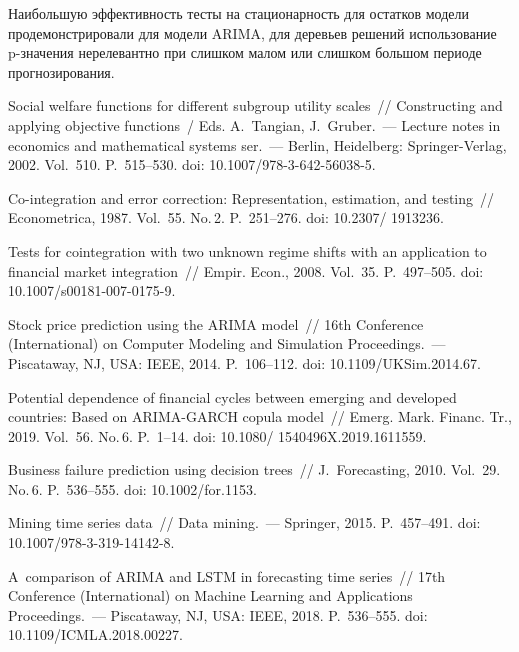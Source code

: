 \begin{multicols}{2}
Наибольшую эффективность тесты на стационарность для остатков модели продемонстрировали 
для модели ARIMA, для деревьев решений использование p-зна\-че\-ния нерелевантно при слишком 
малом или слишком большом периоде прогнозирования.

{\small\frenchspacing
 {%
 \begin{thebibliography}{99}

Social welfare functions for different subgroup utility scales~// 
Constructing and applying objective functions~/ Eds. A.~Tangian, J.~Gruber.~--- 
Lecture notes in economics and mathematical systems ser.~---
 Berlin, Heidelberg: Springer-Verlag, 2002. 
Vol.~510. P.~515--530.  doi: 10.1007/978-3-642-56038-5.


Co-integration and error correction: Representation, estimation, and testing~//  
Econometrica, 1987. Vol.~55. No.\,2. P.~251--276.  doi: 10.2307/ 1913236.


Tests for cointegration with two unknown regime shifts with an application to financial market integration~//  
Empir. Econ., 2008. Vol.~35. P.~497--505. doi: 10.1007/s00181-007-0175-9.

Stock price prediction using the ARIMA model~// 16th 
 Conference (International) on Computer Modeling and Simulation Proceedings.~--- Piscataway, NJ, USA: IEEE, 2014. P.~106--112. 
 doi: 10.1109/UKSim.2014.67.

Potential dependence of financial cycles between emerging and developed countries: Based on ARIMA-GARCH 
copula model~// Emerg. Mark. Financ. Tr., 2019. Vol.~56. No.\,6. P.~1--14. doi: 10.1080/ 1540496X.2019.1611559.


Business failure prediction using decision trees~//
J.~Forecasting, 2010. Vol.~29. No.\,6. P.~536--555. doi: 10.1002/for.1153.

Mining time series data~// Data mining.~--- Springer, 2015. P.~457--491. 
doi: 10.1007/978-3-319-14142-8.


A~comparison of ARIMA and LSTM in forecasting time series~//  17th Conference 
(International) on Machine Learning and Applications Proceedings.~--- Piscataway, NJ, USA: IEEE, 2018. 
P.~536--555. doi: 10.1109/ICMLA.2018.00227.



\end{thebibliography}}}
\end{multicols}
